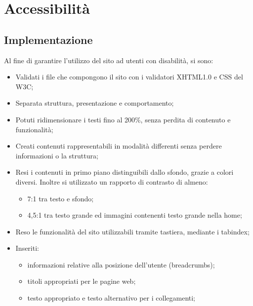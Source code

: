 \section{Accessibilit\`a}{

	\subsection{Implementazione}{
	Al fine di garantire l'utilizzo del sito ad utenti con disabilità, si sono:
	\begin{itemize}\itemsep0.5pt
		\item Validati i file che compongono il sito con i validatori XHTML1.0 e CSS del W3C;
		\item Separata struttura, presentazione e comportamento;
		\item Potuti ridimensionare i testi fino al 200\%, senza perdita di contenuto e funzionalità;
		\item Creati contenuti rappresentabili in modalità differenti senza perdere informazioni o la struttura;  %
		\item Resi i contenuti in primo piano distinguibili dallo sfondo, grazie a colori diversi. Inoltre si utilizzato un rapporto di contrasto di almeno: 
		\begin{itemize}\itemsep1pt
			\item 7:1 tra testo e sfondo;
			\item 4,5:1 tra testo grande ed immagini contenenti testo grande nella home;
		\end{itemize}
		\item Reso le funzionalità del sito utilizzabili tramite tastiera, mediante i tabindex;
		\item Inseriti:
		\begin{itemize}\itemsep0.5pt
			\item informazioni relative alla posizione dell'utente (breadcrumbs); 
			\item titoli appropriati  per le pagine web; 
			\item testo appropriato e testo alternativo per i collegamenti; 

\end{itemize}
\end{itemize}}}

